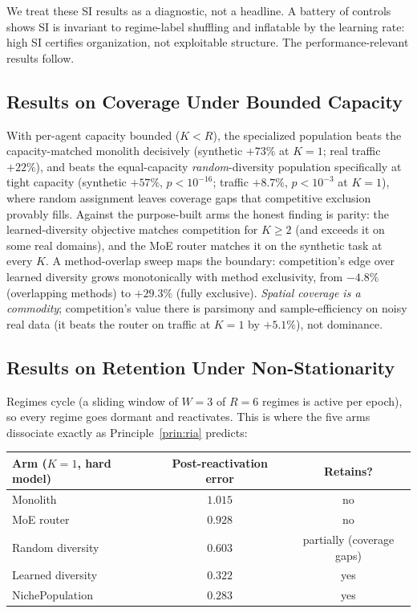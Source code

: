 \documentclass[11pt]{article}
\begin{document}
We treat these SI results as a diagnostic, not a headline. A battery of
controls shows SI is invariant to regime-label shuffling and inflatable by the
learning rate: high SI certifies organization, not exploitable structure. The
performance-relevant results follow.

\subsection{Results on Coverage Under Bounded Capacity}

With per-agent capacity bounded ($K < R$), the specialized population beats the
capacity-matched monolith decisively (synthetic $+73\%$ at $K{=}1$; real traffic
$+22\%$), and beats the equal-capacity \emph{random}-diversity population
specifically at tight capacity (synthetic $+57\%$, $p<10^{-16}$; traffic
$+8.7\%$, $p<10^{-3}$ at $K{=}1$), where random assignment leaves coverage gaps
that competitive exclusion provably fills. Against the purpose-built arms the
honest finding is parity: the learned-diversity objective matches competition
for $K \ge 2$ (and exceeds it on some real domains), and the MoE router matches
it on the synthetic task at every $K$. A method-overlap sweep maps the boundary:
competition's edge over learned diversity grows monotonically with method
exclusivity, from $-4.8\%$ (overlapping methods) to $+29.3\%$ (fully exclusive).
\emph{Spatial coverage is a commodity}; competition's value there is parsimony
and sample-efficiency on noisy real data (it beats the router on traffic at
$K{=}1$ by $+5.1\%$), not dominance.

\subsection{Results on Retention Under Non-Stationarity}

Regimes cycle (a sliding window of $W{=}3$ of $R{=}6$ regimes is active per
epoch), so every regime goes dormant and reactivates. This is where the five
arms dissociate exactly as Principle~\ref{prin:ria} predicts:

\begin{center}
\small
\begin{tabular}{lcc}
\toprule
\textbf{Arm ($K{=}1$, hard model)} & \textbf{Post-reactivation error} &
\textbf{Retains?} \\
\midrule
Monolith & $1.015$ & no \\
MoE router & $0.928$ & no \\
Random diversity & $0.603$ & partially (coverage gaps) \\
Learned diversity & $0.322$ & yes \\
NichePopulation & $\mathbf{0.283}$ & yes \\
\bottomrule
\end{tabular}
\end{center}
\end{document}
